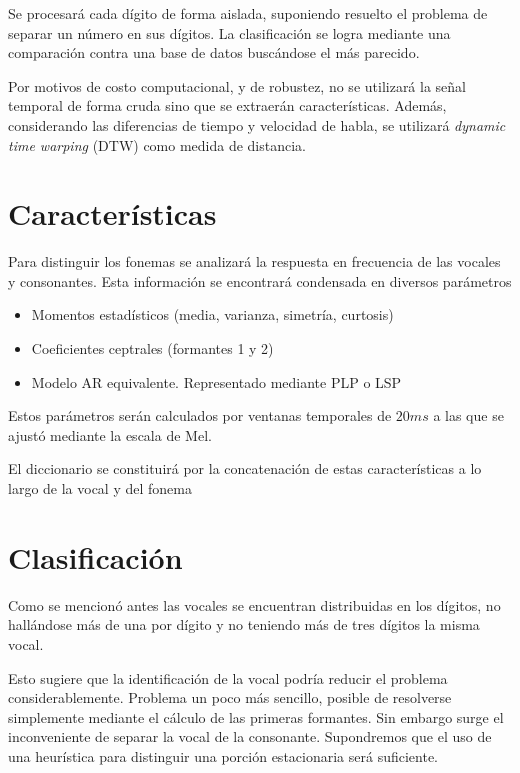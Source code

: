 \documentclass[a4paper]{article}
\begin{document}
		Se procesará cada dígito de forma aislada, suponiendo
		resuelto el problema de separar un número en sus dígitos.
		La clasificación se logra mediante una comparación contra una
		base de datos buscándose el más parecido.

		Por motivos de costo computacional, y de robustez, no se
		utilizará la señal temporal de forma cruda sino que se
		extraerán características.  Además, considerando las
		diferencias de tiempo y velocidad de habla, se utilizará
		\emph{dynamic time warping} (DTW) como medida de distancia.

	\section{Características}
		Para distinguir los fonemas se analizará la
		respuesta en frecuencia de las vocales y consonantes.
		Esta información se encontrará condensada en diversos
		parámetros %
			\begin{itemize} \itemsep0pt
				\item Momentos estadísticos (media, varianza, simetría, curtosis) 
				\item Coeficientes ceptrales (formantes 1 y 2) 
				\item Modelo AR equivalente. Representado mediante PLP o LSP
			\end{itemize}

		Estos parámetros serán calculados por ventanas
		temporales de $20ms$ a las que se ajustó mediante la
		escala de Mel.

		El diccionario se constituirá por la concatenación de
		estas características a lo largo de la vocal y del fonema

	\section{Clasificación}
		Como se mencionó antes las vocales se encuentran
		distribuidas en los dígitos, no hallándose más de
		una por dígito y no teniendo más de tres dígitos la
		misma vocal.

		Esto sugiere que la identificación de la vocal podría
		reducir el problema considerablemente.	Problema un poco
		más sencillo, posible de resolverse simplemente mediante
		el cálculo de las primeras formantes.	Sin embargo surge
		el inconveniente de separar la vocal de la consonante.
		Supondremos que el uso de una heurística para distinguir
		una porción estacionaria será suficiente.
\end{document}
